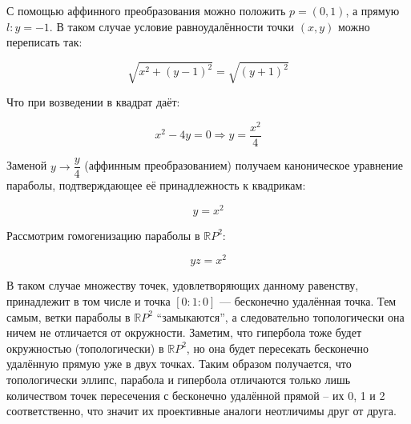 \documentclass[11pt]{article}
\begin{document}
    С помощью аффинного преобразования можно положить $p = (0, 1)$, а прямую $l: y = -1$. В таком случае условие равноудалённости точки $(x, y)$ можно переписать так:

    \begin{equation*}
        \sqrt{x^2 + (y - 1)^2} = \sqrt{(y + 1)^2}
    \end{equation*}

    Что при возведении в квадрат даёт:

    \begin{equation*}
        x^2 - 4y = 0 \Longrightarrow y = \dfrac{x^2}{4}
    \end{equation*}

    Заменой $y \to \dfrac{y}{4}$ (аффинным преобразованием) получаем каноническое уравнение параболы, подтверждающее её принадлежность к квадрикам:

    \begin{equation*}
        y = x^2
    \end{equation*}

    Рассмотрим гомогенизацию параболы в $\mathbb{R}P^2$:

    \begin{equation*}
        yz = x^2
    \end{equation*}

    В таком случае множеству точек, удовлетворяющих данному равенству, принадлежит в том числе и точка $[0:1:0]$ --- бесконечно удалённая точка. Тем самым, ветки параболы в $\mathbb{R}P^2$ ``замыкаются'', а следовательно топологически она ничем не отличается от окружности. Заметим, что гипербола тоже будет окружностью (топологически) в $\mathbb{R}P^2$, но она будет пересекать бесконечно удалённую прямую уже в двух точках. Таким образом получается, что топологически эллипс, парабола и гипербола отличаются только лишь количеством точек пересечения с бесконечно удалённой прямой -- их 0, 1 и 2 соответственно, что значит их проективные аналоги неотличимы друг от друга.
\end{document}
